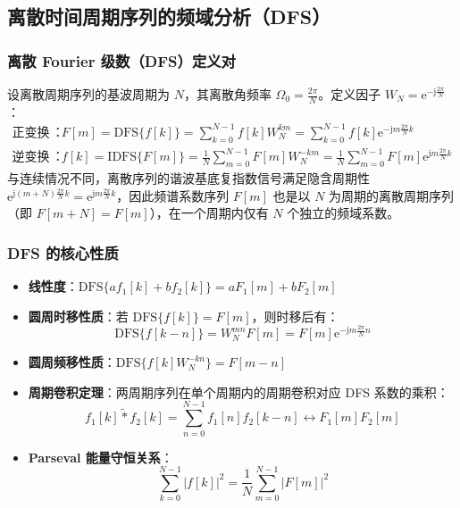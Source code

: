 \documentclass[11pt,a4paper,fontset=fandol]{ctexart}
\theoremstyle{remark}
\begin{document}
\subsection{离散时间周期序列的频域分析（DFS）}

\subsubsection{离散 Fourier 级数（DFS）定义对}
设离散周期序列的基波周期为 $N$，其离散角频率 $\Omega_0 = \frac{2\pi}{N}$。定义因子 $W_N = \mathrm{e}^{-\mathrm{j}\frac{2\pi}{N}}$：
\begin{align}
    \text{正变换（分析式）}：& F[m] = \mathrm{DFS}\{f[k]\} = \sum_{k=0}^{N-1} f[k] W_N^{km} = \sum_{k=0}^{N-1} f[k]\mathrm{e}^{-\mathrm{j}m\frac{2\pi}{N}k} \\
    \text{逆变换（综合式）}：& f[k] = \mathrm{IDFS}\{F[m]\} = \frac{1}{N} \sum_{m=0}^{N-1} F[m] W_N^{-km} = \frac{1}{N}\sum_{m=0}^{N-1} F[m]\mathrm{e}^{\mathrm{j}m\frac{2\pi}{N}k}
\end{align}
与连续情况不同，离散序列的谐波基底复指数信号满足隐含周期性 $\mathrm{e}^{\mathrm{j}(m+N)\frac{2\pi}{N}k} = \mathrm{e}^{\mathrm{j}m\frac{2\pi}{N}k}$，因此频谱系数序列 $F[m]$ 也是以 $N$ 为周期的离散周期序列（即 $F[m + N] = F[m]$），在一个周期内仅有 $N$ 个独立的频域系数。

\subsubsection{DFS 的核心性质}
\begin{itemize}
    \item \textbf{线性度}：$\mathrm{DFS}\{a f_1[k] + b f_2[k]\} = a F_1[m] + b F_2[m]$
    \item \textbf{圆周时移性质}：若 $\mathrm{DFS}\{f[k]\} = F[m]$，则时移后有：
    \begin{equation}
        \mathrm{DFS}\{f[k - n]\} = W_N^{mn} F[m] = F[m]\mathrm{e}^{-\mathrm{j}m\frac{2\pi}{N}n}
    \end{equation}
    \item \textbf{圆周频移性质}：$\mathrm{DFS}\{f[k]W_N^{-kn}\} = F[m - n]$
    \item \textbf{周期卷积定理}：两周期序列在单个周期内的周期卷积对应 DFS 系数的乘积：
    \begin{equation}
        f_1[k] \tilde{*} f_2[k] = \sum_{n=0}^{N-1} f_1[n]f_2[k - n] \longleftrightarrow F_1[m]F_2[m]
    \end{equation}
    \item \textbf{Parseval 能量守恒关系}：
    \begin{equation}
        \sum_{k=0}^{N-1} |f[k]|^2 = \frac{1}{N} \sum_{m=0}^{N-1} |F[m]|^2
    \end{equation}
\end{itemize}
\end{document}
